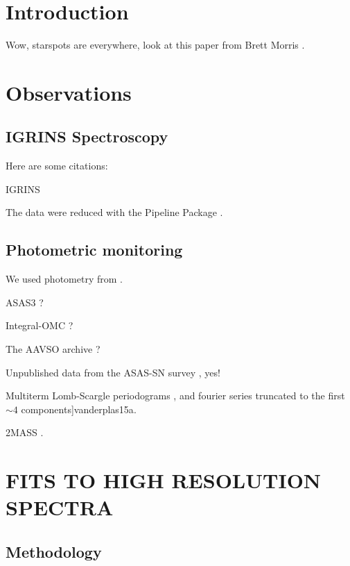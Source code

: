 \documentclass[twocolumn]{emulateapj}%
\begin{document}
\maketitle

\section{Introduction}\label{sec:intro}

Wow, starspots are everywhere, look at this paper from Brett Morris \citep{}.

\section{Observations}\label{sec:obs}

\subsection{IGRINS Spectroscopy}\label{sec:igrins}
Here are some citations:

IGRINS \citep{park14}

The data were reduced with the Pipeline Package \citep{jaejoonlee15}.

\subsection{Photometric monitoring}

We used photometry from \citep{grankin08}.


ASAS3 \citep{pojmanski04}?

Integral-OMC \citep{garzon12}?

The AAVSO archive \citep{kafka16}?

Unpublished data from the ASAS-SN survey \citep{shappee14}, yes!


Multiterm Lomb-Scargle periodograms \citep{ivezic14}, and fourier series truncated to the first $\sim 4$ components]{vanderplas15a}.

2MASS \citep{skrutskie06}.

\section{FITS TO HIGH RESOLUTION SPECTRA}\label{sec:Starfish}


\subsection{Methodology}\label{sec:methods}
\end{document}
